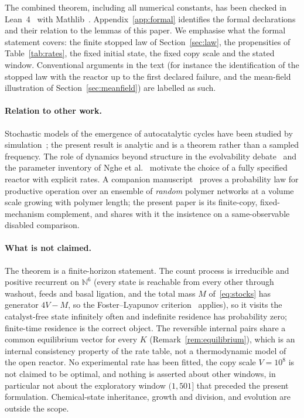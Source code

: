 \documentclass[11pt,a4paper]{article}
\theoremstyle{plain}
\theoremstyle{definition}
\theoremstyle{remark}
\newcommand{\N}{\mathbb N}
\begin{document}
The combined theorem, including all numerical constants, has been checked in Lean~4~\citep{demoura2021} with Mathlib~\citep{mathlib2020}. Appendix~\ref{app:formal} identifies the formal declarations and their relation to the lemmas of this paper. We emphasise what the formal statement covers: the finite stopped law of Section~\ref{sec:law}, the propensities of Table~\ref{tab:rates}, the fixed initial state, the fixed copy scale and the stated window. Conventional arguments in the text (for instance the identification of the stopped law with the reactor up to the first declared failure, and the mean-field illustration of Section~\ref{sec:meanfield}) are labelled as such.

\paragraph{Relation to other work.}
Stochastic models of the emergence of autocatalytic cycles have been studied by simulation~\citep{filisetti2011}; the present result is analytic and is a theorem rather than a sampled frequency. The role of dynamics beyond structure in the evolvability debate~\citep{vasas2010} and the parameter inventory of Nghe et al.~\citep{nghe2015} motivate the choice of a fully specified reactor with explicit rates. A companion manuscript~\citep{companion2026} proves a probability law for productive operation over an ensemble of \emph{random} polymer networks at a volume scale growing with polymer length; the present paper is its finite-copy, fixed-mechanism complement, and shares with it the insistence on a same-observable disabled comparison.

\paragraph{What is not claimed.}
The theorem is a finite-horizon statement. The count process is irreducible and positive recurrent on $\N^6$ (every state is reachable from every other through washout, feeds and basal ligation, and the total mass $M$ of~\eqref{eq:stocks} has generator $4V-M$, so the Foster--Lyapunov criterion~\citep{meyn1993,anderson2018} applies), so it visits the catalyst-free state infinitely often and indefinite residence has probability zero; finite-time residence is the correct object. The reversible internal pairs share a common equilibrium vector for every $K$ (Remark~\ref{rem:equilibrium}), which is an internal consistency property of the rate table, not a thermodynamic model of the open reactor. No experimental rate has been fitted, the copy scale $V=10^8$ is not claimed to be optimal, and nothing is asserted about other windows, in particular not about the exploratory window $(1,501]$ that preceded the present formulation. Chemical-state inheritance, growth and division, and evolution are outside the scope.
\end{document}

